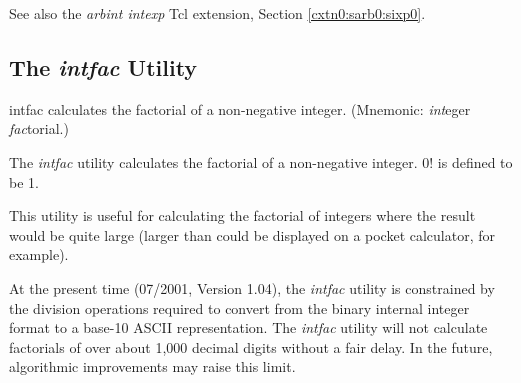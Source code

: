 \begin{dosutilcommandseealso}
See also the \emph{arbint intexp} Tcl extension, 
Section \cxtnzeroxrefhyphen{}\ref{cxtn0:sarb0:sixp0}.
\end{dosutilcommandseealso}

\subsection{The \emph{intfac} Utility}
\label{cdcm0:sali0:sifc0}

\begin{dosutilcommandname}{intfac}%
calculates the factorial of a non-negative
integer.  (Mnemonic:  \emph{int}eger
\emph{fac}torial.)
\end{dosutilcommandname}

\begin{dosutilcommandsynopsis}
\end{dosutilcommandsynopsis}

\begin{dosutilcommanddescription}
The \emph{intfac} utility calculates the factorial of 
a non-negative integer.  0! is defined to be 1.

This utility is useful for calculating the factorial of 
integers where the result would be quite large (larger than
could be displayed on a pocket calculator, for example).
\end{dosutilcommanddescription}

\begin{dosutilcommandremarks}
At the present time (07/2001, Version 1.04), the \emph{intfac} utility
is constrained by the division operations required to convert from the
binary internal integer format to a base-10 ASCII representation.
The \emph{intfac} utility will not calculate factorials of over about
1,000 decimal digits without a fair delay.  In the future, algorithmic
improvements may raise this limit.
\end{dosutilcommandremarks}

